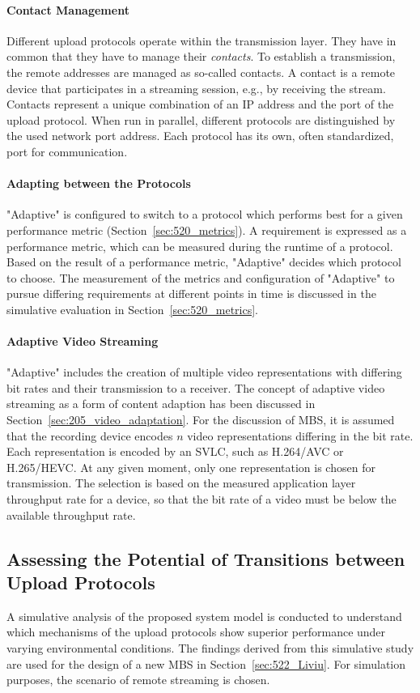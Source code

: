 \paragraph{Contact Management}
Different upload protocols operate within the transmission layer.
They have in common that they have to manage their \emph{contacts}. To establish a transmission, the remote addresses are managed as so-called contacts. 
A contact is a remote device that participates in a streaming session, e.g., by receiving the stream. 
Contacts represent a unique combination of an \ac{IP} address and the port of the upload protocol. 
When run in parallel, different protocols are distinguished by the used network port address. 
Each protocol has its own, often standardized, port for communication.

\paragraph{Adapting between the Protocols}
"Adaptive" is configured to switch to a protocol which performs best for a given performance metric (Section~\ref{sec:520_metrics}).
A requirement is expressed as a performance metric, which can be measured during the runtime of a protocol.
Based on the result of a performance metric, "Adaptive" decides which protocol to choose. 
The measurement of the metrics and configuration of "Adaptive" to pursue differing requirements at different points in time is discussed in the simulative evaluation in Section~\ref{sec:520_metrics}.
\paragraph{Adaptive Video Streaming}
"Adaptive" includes the creation of multiple video representations with differing bit rates and their transmission to a receiver.
The concept of adaptive video streaming as a form of content adaption has been discussed in Section~\ref{sec:205_video_adaptation}.
For the discussion of \ac{MBS}, it is assumed that the recording device encodes $n$ video representations differing in the bit rate.
Each representation is encoded by an \ac{SVLC}, such as H.264/\ac{AVC} or H.265/\ac{HEVC}.
At any given moment, only one representation is chosen for transmission.
The selection is based on the measured application layer throughput rate for a device, so that the bit rate of a video must be below the available throughput rate.
\subsection{Assessing the Potential of Transitions between Upload Protocols}
\label{sec:520_simulativeAnalysis}
A simulative analysis of the proposed system model is conducted to understand which mechanisms of the upload protocols show superior performance under varying environmental conditions.
The findings derived from this simulative study are used for the design of a new \ac{MBS} in Section~\ref{sec:522_Liviu}. 
For simulation purposes, the scenario of remote streaming is chosen.
